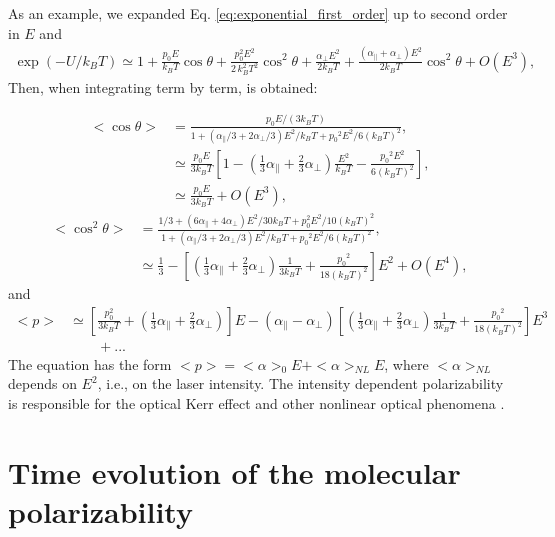 \documentclass[12pt,letterpaper]{article}
\begin{document}
As an example, we expanded Eq. \eqref{eq:exponential_first_order} up to second order in $E$ and  
\begin{align}\label{eq:exponential_second_order}
  \exp(-U/k_BT)\simeq 1+\frac{p_0E}{k_BT}\cos\theta+ \frac{p_0^2E^2}{2\,k_B^2T^2}\cos^2\theta + \frac{\alpha_\bot E^2}{2k_BT} +
\frac{\left(\alpha_\parallel + \alpha_\bot\right) E^2}{2k_BT}\cos^2\theta+ O(E^3),
\end{align}
Then, when integrating term by term, is obtained:

\begin{subequations}\label{eq:statistics_second_order_cos}
 \begin{align}
  <\cos\theta>&=\frac{p_0E/(3k_BT)}{1+\left(\alpha_\parallel/3+2\alpha_\bot/3\right){E}^{2}/k_BT+{p_0}^{2}{E}^{2}/6(k_BT)^{2}},\\
  &\simeq \frac{p_0E}{3k_BT}\left[1-\left(\frac{1}{3}\alpha_\parallel+\frac{2}{3}\alpha_\bot\right)\frac{E^{2}}{k_BT}-\frac{{p_0}^{2}{E}^{2}}{6(k_BT)^{2}}\right],\\
  &\simeq \frac{p_0E}{3k_BT} + O(E^3),	
 \end{align}
\end{subequations}
\begin{subequations}\label{eq:statistics_second_order_cos_sqr}
 \begin{align}
  <\cos^2\theta>&=\frac{1/3 + \left(6\alpha_\parallel +4\alpha_\bot\right)E^2/30k_BT+p_0^2E^2/10(k_BT)^{2}}{1+\left(\alpha_\parallel/3+2\alpha_\bot/3\right){E}^{2}/k_BT+{p_0}^{2}{E}^{2}/6(k_BT)^{2}},\\
&\simeq \frac{1}{3} - \left[\left(\frac{1}{3}\alpha_\parallel+\frac{2}{3}\alpha_\bot\right)\frac{1}{3k_BT}+\frac{{p_0}^{2}}{18(k_BT)^{2}}\right]E^2 + O(E^4),
 \end{align}
\end{subequations}
and
\begin{align}\label{eq:total_pol_second_order}
 <p>&\simeq\left[\frac{p_0^2}{3k_BT}+\left(\frac{1}{3}\alpha_\parallel+\frac{2}{3}\alpha_\bot\right)\right]E - (\alpha_\parallel - \alpha_\bot)\left[\left(\frac{1}{3}\alpha_\parallel+\frac{2}{3}\alpha_\bot\right)\frac{1}{3k_BT}+\frac{{p_0}^{2}}{18(k_BT)^{2}}\right]E^3\nonumber\\ 
 &\qquad + ...
\end{align}
The equation has the form $<p>=<\alpha>_0E + <\alpha>_{NL}E$, where $<\alpha>_{NL}$ depends on $E^2$, i.e., on the laser intensity. The intensity dependent polarizability is responsible for the optical Kerr effect and other nonlinear optical phenomena \cite{boyd2008}.


\section{Time evolution of the molecular polarizability}\label{time}

 

\end{document}
